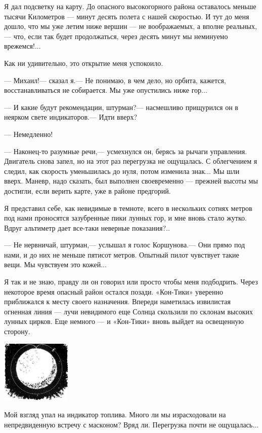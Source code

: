 \documentclass[11pt,a4paper,oneside]{article}
\begin{document}
Я дал подсветку на карту. До опасного высокогорного района оставалось меньше тысячи Километров — минут десять полета с нашей скоростью. И тут до меня дошло, что мы уже летим ниже вершин — не воображаемых, а вполне реальных,— что, если так будет продолжаться, через десять минут мы неминуемо врежемся!...

Как ни удивительно, это открытие меня успокоило.

— Михаил!— сказал я.— Не понимаю, в чем дело, но орбита, кажется, восстанавливаться не собирается. Мы уже опустились ниже гор...

— И какие будут рекомендации, штурман?— насмешливо прищурился он в неярком свете индикаторов.— Идти вверх?

— Немедленно!

— Наконец-то разумные речи,— усмехнулся он, берясь за рычаги управления. Двигатель снова запел, но на этот раз перегрузка не ощущалась. С облегчением я следил, как скорость уменьшилась до нуля, потом изменила знак... Мы шли вверх. Маневр, надо сказать, был выполнен своевременно — прежней высоты мы достигли, если верить карте, уже в районе предгорий.

Я представил себе, как невидимые в темноте, всего в нескольких сотнях метров под нами проносятся зазубренные пики лунных гор, и мне вновь стало жутко. Вдруг альтиметр дает все-таки неверные показания?..

— Не нервничай, штурман,— услышал я голос Коршунова.— Они прямо под нами, и до них не меньше пятисот метров. Опытный пилот чувствует такие вещи. Мы чувствуем это кожей...

Я так и не знаю, правду ли он говорил или просто чтобы меня подбодрить. Через некоторое время опасный район остался позади. «Кон-Тики» уверенно приближался к месту своего назначения. Впереди наметилась извилистая огненная линия — лучи невидимого еще Солнца скользили по склонам высоких лунных цирков. Еще немного — и «Кон-Тики» вновь выйдет на освещенную сторону.

\includegraphics[width=0.25\textwidth]{bolivar2}

Мой взгляд упал на индикатор топлива. Много ли мы израсходовали на непредвиденную встречу с масконом? Вряд ли. Перегрузка почти не ощущалась...
\end{document}
